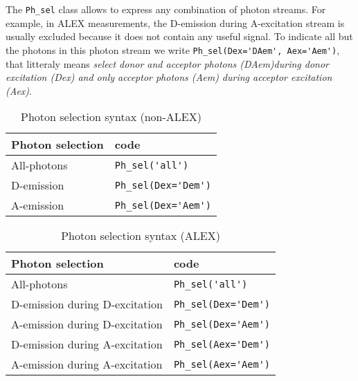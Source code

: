 The \verb|Ph_sel| class allows to express any combination of photon streams. 
For example, in ALEX measurements, the D-emission during A-excitation stream is usually excluded because it does not contain any useful signal\cite{Lee_2005}. To indicate all but the photons in this photon stream we write \verb|Ph_sel(Dex='DAem', Aex='Aem')|, that litteraly means \textit{select donor and acceptor photons (DAem)during donor excitation (Dex) and only acceptor photons (Aem) during acceptor excitation (Aex)}.

\begin{table}
\begin{tabular}{l|l}
  Photon selection  & code \\
  \hline
  All-photons       & \verb|Ph_sel('all')|\\
  D-emission    & \verb|Ph_sel(Dex='Dem')|\\
  A-emission & \verb|Ph_sel(Dex='Aem')|\\
\end{tabular}
\caption{\label{tab:ph_sel_smfret}Photon selection syntax (non-ALEX)}
\end{table}

\begin{table}
\begin{tabular}{l|l}
  Photon selection  & code \\
  \hline
  All-photons & \verb|Ph_sel('all')|\\
  D-emission during D-excitation & \verb|Ph_sel(Dex='Dem')|\\
  A-emission during D-excitation & \verb|Ph_sel(Dex='Aem')|\\
  D-emission during A-excitation & \verb|Ph_sel(Aex='Dem')|\\
  A-emission during A-excitation & \verb|Ph_sel(Aex='Aem')|\\
\end{tabular}
\caption{\label{tab:ph_sel_alex}Photon selection syntax (ALEX)}
\end{table}
